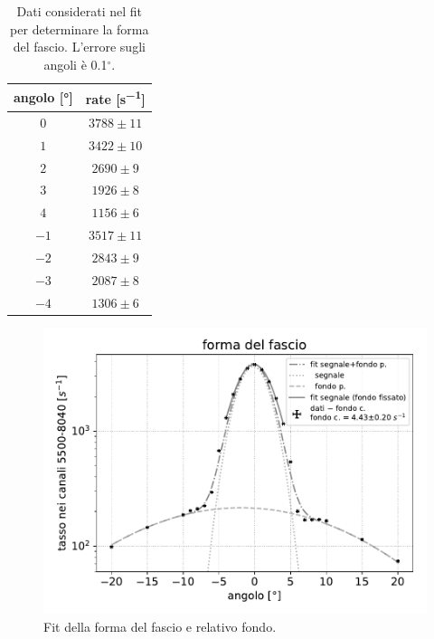 \begin{table}
\centering

\begin{tabular}{|c|c|}
\hline
angolo [\si{\degree}] & rate [\si{s^{-1}}] \\
\hline
$ 0 $ & $ 3788\pm11 $ \\ 

$ 1 $ & $ 3422\pm10 $ \\ 
$ 2 $ & $ 2690 \pm 9 $ \\ 
$ 3 $ & $ 1926 \pm 8 $ \\ 
$ 4 $ & $ 1156 \pm 6 $ \\ 

$ -1 $ & $ 3517\pm11 $ \\ 
$ -2 $ & $ 2843 \pm 9 $ \\ 
$ -3 $ & $ 2087 \pm 8 $ \\ 
$ -4 $ & $ 1306 \pm 6 $ \\ 
\hline
\end{tabular}

\caption{Dati considerati nel fit per determinare la forma del fascio. L'errore sugli angoli è 0.1$^{\circ}$.}
\label{tabfo}
\end{table}

\begin{figure}
\centering
\includegraphics[width=25 em]{forma}
\caption{Fit della forma del fascio e relativo fondo.}
\label{forma}
\end{figure}



